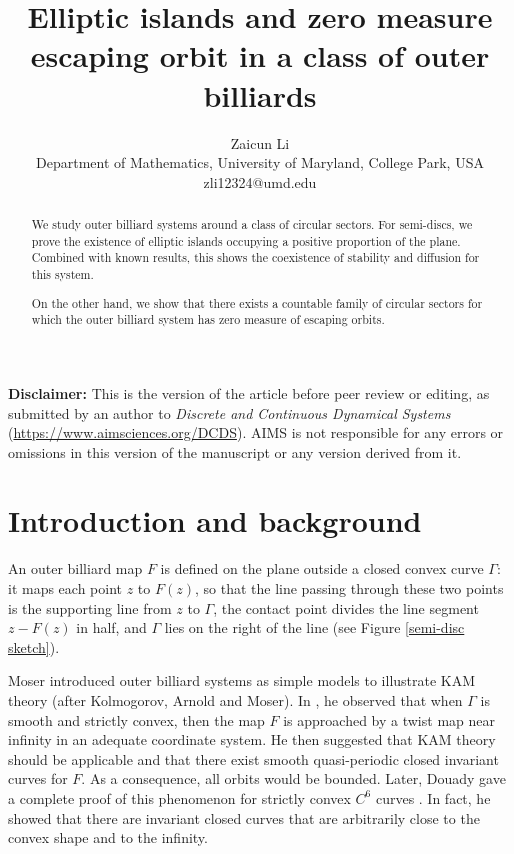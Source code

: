 \documentclass{article}
\numberwithin{figure}{section}
\numberwithin{equation}{section}
\theoremstyle{remark}
\theoremstyle{definition}
\begin{document}
\title{Elliptic islands and zero measure escaping orbit in a class of outer billiards}
\author{Zaicun Li\\ \small Department of Mathematics, University of Maryland, College Park, USA\\ \small zli12324@umd.edu}
\date{}
\maketitle
\thispagestyle{firstpage}

\noindent\textbf{Disclaimer:} This is the version of the article before peer review or editing, as submitted by an author to \textit{Discrete and Continuous Dynamical Systems} (\url{https://www.aimsciences.org/DCDS}). AIMS is not responsible for any errors or omissions in this version of the manuscript or any version derived from it.
\begin{abstract}
We study outer billiard systems around a class of circular sectors.
 For semi-discs, we prove the existence of elliptic islands occupying a positive proportion of the plane. Combined with known results, this shows the coexistence of stability and diffusion for this system.

On the other hand, we show that there exists a countable family of circular sectors
for which the outer billiard system has zero measure of escaping orbits.

\end{abstract}

\section{Introduction and
background}\label{introduction-and-background}
An outer billiard map $F$ is defined on the plane outside a closed convex curve $\Gamma$: it maps each point $z$ to $F(z)$, so that the line passing through these two points is the supporting line from $z$ to $\Gamma$, the contact point divides the line segment $z-F(z)$ in half, and $\Gamma$ lies on the right of the line (see Figure \ref{semi-disc sketch}).

Moser introduced outer billiard systems as simple models to illustrate KAM theory (after Kolmogorov, Arnold and Moser). %
In \cite{MR0442980}, he observed that when $\Gamma$ is smooth and strictly convex, then the map $F$ is approached by a twist map near infinity in an adequate coordinate system. 
He then suggested that KAM theory should be applicable and that there exist smooth quasi-periodic closed invariant curves
for $F$. As a consequence, all orbits would be bounded. Later, Douady gave a complete proof of this phenomenon for strictly convex $C^6$ curves \cite{Douady}. In fact, he showed that there are invariant closed curves that are arbitrarily close to the convex shape and to the infinity.
\end{document}

